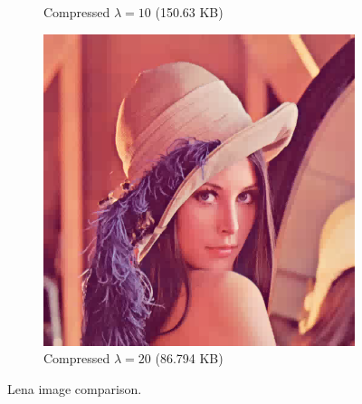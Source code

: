 \documentclass[12pt]{article}
\theoremstyle{definition}
\begin{document}
\begin{figure}
\begin{subfigure}[t]{.49\linewidth}
      \caption{Compressed \(\lambda = 10\) (150.63 KB)}
    \end{subfigure}
    \begin{subfigure}[t]{.49\linewidth}
      \centering
      \includegraphics[width=.93\linewidth]{figs/lena_haar_20.png}
      \caption{Compressed \(\lambda = 20\) (86.794 KB)}
    \end{subfigure}
    \caption{Lena image comparison.}
    \label{fig:lena}
  \end{figure}
\end{document}
